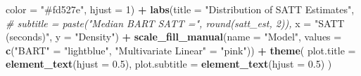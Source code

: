 \documentclass[
  12pt,
]{article}
\newenvironment{Shaded}{\begin{snugshade}}{\end{snugshade}}
\newcommand{\AttributeTok}[1]{\textcolor[rgb]{0.13,0.29,0.53}{#1}}
\newcommand{\CommentTok}[1]{\textcolor[rgb]{0.56,0.35,0.01}{\textit{#1}}}
\newcommand{\DecValTok}[1]{\textcolor[rgb]{0.00,0.00,0.81}{#1}}
\newcommand{\FloatTok}[1]{\textcolor[rgb]{0.00,0.00,0.81}{#1}}
\newcommand{\FunctionTok}[1]{\textcolor[rgb]{0.13,0.29,0.53}{\textbf{#1}}}
\newcommand{\NormalTok}[1]{#1}
\newcommand{\OtherTok}[1]{\textcolor[rgb]{0.56,0.35,0.01}{#1}}
\newcommand{\SpecialCharTok}[1]{\textcolor[rgb]{0.81,0.36,0.00}{\textbf{#1}}}
\newcommand{\StringTok}[1]{\textcolor[rgb]{0.31,0.60,0.02}{#1}}
\begin{document}
\begin{Shaded}
\begin{Highlighting}[]
           \AttributeTok{color =} \StringTok{"\#fd527e"}\NormalTok{,}
           \AttributeTok{hjust =} \DecValTok{1}\NormalTok{) }\SpecialCharTok{+}
  \FunctionTok{labs}\NormalTok{(}\AttributeTok{title =} \StringTok{"Distribution of SATT Estimates"}\NormalTok{,}
       \CommentTok{\# subtitle = paste("Median BART SATT =", round(satt\_est, 2)),}
       \AttributeTok{x =} \StringTok{"SATT (seconds)"}\NormalTok{,}
       \AttributeTok{y =} \StringTok{"Density"}\NormalTok{) }\SpecialCharTok{+} 
  \FunctionTok{scale\_fill\_manual}\NormalTok{(}\AttributeTok{name =} \StringTok{"Model"}\NormalTok{, }
                    \AttributeTok{values =} \FunctionTok{c}\NormalTok{(}\StringTok{"BART"} \OtherTok{=} \StringTok{"lightblue"}\NormalTok{, }
                               \StringTok{"Multivariate Linear"} \OtherTok{=} \StringTok{"pink"}\NormalTok{)) }\SpecialCharTok{+}
  \FunctionTok{theme}\NormalTok{(}
    \AttributeTok{plot.title =} \FunctionTok{element\_text}\NormalTok{(}\AttributeTok{hjust =} \FloatTok{0.5}\NormalTok{),}
    \AttributeTok{plot.subtitle =} \FunctionTok{element\_text}\NormalTok{(}\AttributeTok{hjust =} \FloatTok{0.5}\NormalTok{)}
\NormalTok{  )}
\end{Highlighting}
\end{Shaded}
\end{document}

